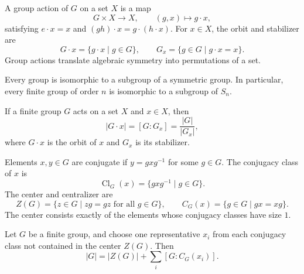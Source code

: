     \begin{definition}
        A group action of $G$ on a set $X$ is a map
        \[
            G\times X\to X,
            \qquad
            (g,x)\mapsto g\cdot x,
        \]
        satisfying $e\cdot x=x$ and $(gh)\cdot x=g\cdot(h\cdot x)$. For
        $x\in X$, the orbit and stabilizer are
        \[
            G\cdot x=\{g\cdot x\mid g\in G\},
            \qquad
            G_x=\{g\in G\mid g\cdot x=x\}.
        \]
        Group actions translate algebraic symmetry into permutations of a set.
    \end{definition}

    \begin{theorem}
        Every group is isomorphic to a subgroup of a symmetric group. In
        particular, every finite group of order $n$ is isomorphic to a subgroup
        of $S_n$.
    \end{theorem}

    \begin{theorem}
        If a finite group $G$ acts on a set $X$ and $x\in X$, then
        \[
            |G\cdot x|
            =
            [G:G_x]
            =
            \frac{|G|}{|G_x|},
        \]
        where $G\cdot x$ is the orbit of $x$ and $G_x$ is its stabilizer.
    \end{theorem}

    \begin{definition}
        Elements $x,y\in G$ are conjugate if $y=gxg^{-1}$ for some $g\in G$.
        The conjugacy class of $x$ is
        \[
            \operatorname{Cl}_G(x)=\{gxg^{-1}\mid g\in G\}.
        \]
        The center and centralizer are
        \[
            Z(G)=\{z\in G\mid zg=gz\text{ for all }g\in G\},
            \qquad
            C_G(x)=\{g\in G\mid gx=xg\}.
        \]
        The center consists exactly of the elements whose conjugacy classes have
        size $1$.
    \end{definition}

    \begin{theorem}
        Let $G$ be a finite group, and choose one representative $x_i$ from
        each conjugacy class not contained in the center $Z(G)$. Then
        \[
            |G|
            =
            |Z(G)|
            +
            \sum_i [G:C_G(x_i)].
        \]
    \end{theorem}

